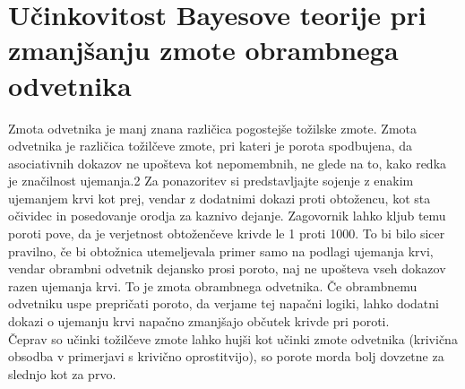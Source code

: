 \documentclass[12pt,a4paper]{amsart}
\theoremstyle{definition} %
\theoremstyle{plain} %
\begin{document}
\section{Učinkovitost Bayesove teorije pri zmanjšanju zmote obrambnega odvetnika}
Zmota odvetnika je manj znana različica pogostejše tožilske zmote. Zmota odvetnika je različica tožilčeve zmote, pri kateri je porota spodbujena, 
da asociativnih dokazov ne upošteva kot nepomembnih, ne glede na to, kako redka je značilnost ujemanja.2 Za ponazoritev si predstavljajte 
sojenje z enakim ujemanjem krvi kot prej, vendar z dodatnimi dokazi proti obtožencu, kot sta očividec in posedovanje orodja za kaznivo dejanje. 
Zagovornik lahko kljub temu poroti pove, da je verjetnost obtoženčeve krivde le 1 proti 1000. To bi bilo sicer pravilno, če bi obtožnica utemeljevala 
primer samo na podlagi ujemanja krvi, vendar obrambni odvetnik dejansko prosi poroto, naj ne upošteva vseh dokazov razen ujemanja krvi. To je zmota 
obrambnega odvetnika. Če obrambnemu odvetniku uspe prepričati poroto, da verjame tej napačni logiki, lahko dodatni dokazi o ujemanju krvi napačno 
zmanjšajo občutek krivde pri poroti.\\
Čeprav so učinki tožilčeve zmote lahko hujši kot učinki zmote odvetnika (krivična obsodba v primerjavi s krivično oprostitvijo), so porote morda 
bolj dovzetne za slednjo kot za prvo. 


\end{document}
